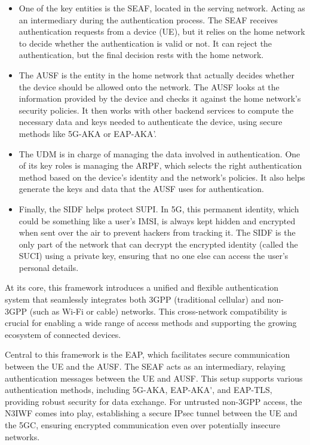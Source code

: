 \begin{itemize}
    \item{
        One of the key entities is the \ac{SEAF}, located in the serving network. Acting as an intermediary during the authentication process. The \ac{SEAF} receives authentication requests from a device (\ac{UE}), but it relies on the home network to decide whether the authentication is valid or not. It can reject the authentication, but the final decision rests with the home network.
    }
    \item{
        The \ac{AUSF} is the entity in the home network that actually decides whether the device should be allowed onto the network. The \ac{AUSF} looks at the information provided by the device and checks it against the home network's security policies. It then works with other backend services to compute the necessary data and keys needed to authenticate the device, using secure methods like \ac{5G-AKA} or \ac{EAP-AKA’}.
    }
    \item{
        The \ac{UDM} is in charge of managing the data involved in authentication. One of its key roles is managing the \ac{ARPF}, which selects the right authentication method based on the device's identity and the network's policies. It also helps generate the keys and data that the \ac{AUSF} uses for authentication.
    }
    \item{
        Finally, the \ac{SIDF} helps protect \ac{SUPI}. In \ac{5G}, this permanent identity, which could be something like a user’s \ac{IMSI}, is always kept hidden and encrypted when sent over the air to prevent hackers from tracking it. The \ac{SIDF} is the only part of the network that can decrypt the encrypted identity (called the \ac{SUCI}) using a private key, ensuring that no one else can access the user’s personal details.
    }
\end{itemize}

At its core, this framework introduces a unified and flexible authentication system that seamlessly integrates both \ac{3GPP} (traditional cellular) and non-\ac{3GPP} (such as Wi-Fi or cable) networks. This cross-network compatibility is crucial for enabling a wide range of access methods and supporting the growing ecosystem of connected devices.

Central to this framework is the \ac{EAP}, which facilitates secure communication between the \ac{UE} and the \ac{AUSF}. The \ac{SEAF} acts as an intermediary, relaying authentication messages between the \ac{UE} and \ac{AUSF}. This setup supports various authentication methods, including \ac{5G-AKA}, \ac{EAP-AKA'}, and \ac{EAP-TLS}, providing robust security for data exchange. For untrusted non-\ac{3GPP} access, the \ac{N3IWF} comes into play, establishing a secure \ac{IPsec} tunnel between the \ac{UE} and the \acl{5GC}, ensuring encrypted communication even over potentially insecure networks.%

